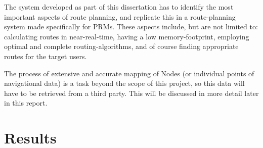 The system developed as part of this dissertation has to identify the most important aspects of route planning, and replicate this in a route-planning system made specifically for PRMs.
These aspects include, but are not limited to: calculating routes in near-real-time, having a low memory-footprint, employing optimal and complete routing-algorithms, and of course finding appropriate routes for the target users.

The process of extensive and accurate mapping of Nodes (or individual points of navigational data) is a task beyond the scope of this project, so this data will have to be retrieved from a third party. This will be discussed in more detail later in this report.


\section{Results}